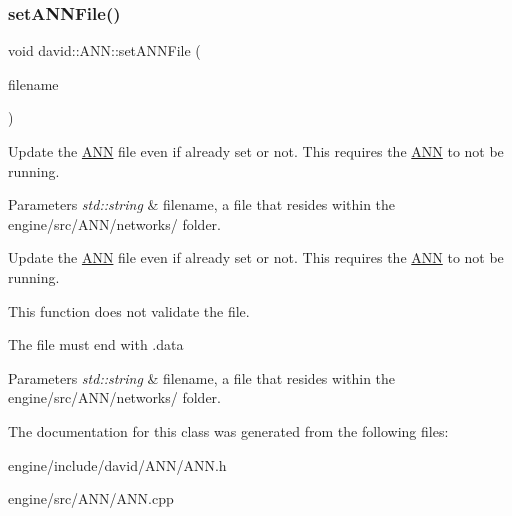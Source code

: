 \subsubsection{\texorpdfstring{set\+A\+N\+N\+File()}{setANNFile()}}
{\footnotesize\ttfamily void david\+::\+A\+N\+N\+::set\+A\+N\+N\+File (\begin{DoxyParamCaption}\item[{std\+::string}]{filename }\end{DoxyParamCaption})}

Update the \hyperlink{classdavid_1_1ANN}{A\+NN} file even if already set or not. This requires the \hyperlink{classdavid_1_1ANN}{A\+NN} to not be running.


\begin{DoxyParams}{Parameters}
{\em std\+::string} & filename, a file that resides within the engine/src/\+A\+N\+N/networks/ folder.\\
\hline
\end{DoxyParams}
Update the \hyperlink{classdavid_1_1ANN}{A\+NN} file even if already set or not. This requires the \hyperlink{classdavid_1_1ANN}{A\+NN} to not be running.

This function does not validate the file.

The file must end with \textquotesingle{}.data\textquotesingle{}


\begin{DoxyParams}{Parameters}
{\em std\+::string} & filename, a file that resides within the engine/src/\+A\+N\+N/networks/ folder. \\
\hline
\end{DoxyParams}


The documentation for this class was generated from the following files\+:\begin{DoxyCompactItemize}
\item 
engine/include/david/\+A\+N\+N/A\+N\+N.\+h\item 
engine/src/\+A\+N\+N/A\+N\+N.\+cpp\end{DoxyCompactItemize}
